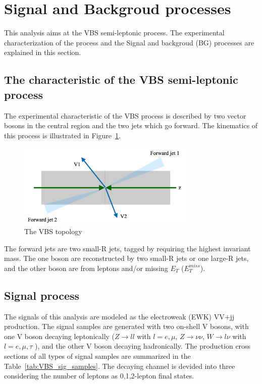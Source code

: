 \section{Signal and Backgroud processes}

This analysis aims at the VBS semi-leptonic process. The experimental characterization of the process and the Signal and backgroud (BG) processes are explained in this section.

\subsection{The characteristic of the VBS semi-leptonic process}
The experimental characteristic of the VBS process is described by two vector bosons in the central region and the two jets which go forward.
The kinematics of this process is illustrated in Figure~\ref{fig:VBStopology}.
\begin{figure}[tbp]
\begin{center}
 \includegraphics[width=0.75\textwidth,keepaspectratio]{figures/VBStopology}
\caption{
The VBS topology
}
\label{fig:VBStopology}
\end{center}
\end{figure}

The forward jets are two small-R jets, tagged by requiring the highest invariant mass. The one boson are reconstructed by two small-R jets or one large-R jets, and the other boson are from leptons and/or missing $E_T$ ($E_T^{miss}$).

\subsection{Signal process}

The signals of this analysis are modeled as the electroweak (EWK) VV$\plus$jj production. The signal samples are generated with two on-shell V bosons, with one V boson decaying leptonically ($Z \rightarrow ll$ with $l = e,\mu$, $Z \rightarrow \nu\nu$, $W\rightarrow l\nu$ with $l = e,\mu,\tau$ ), and the other V boson decaying hadronically. The production cross sections of all types of signal samples are summarized in the Table~\ref{tab:VBS_sig_samples}. The decaying channel is devided into three considering the number of leptons as 0,1,2-lepton final states. 

